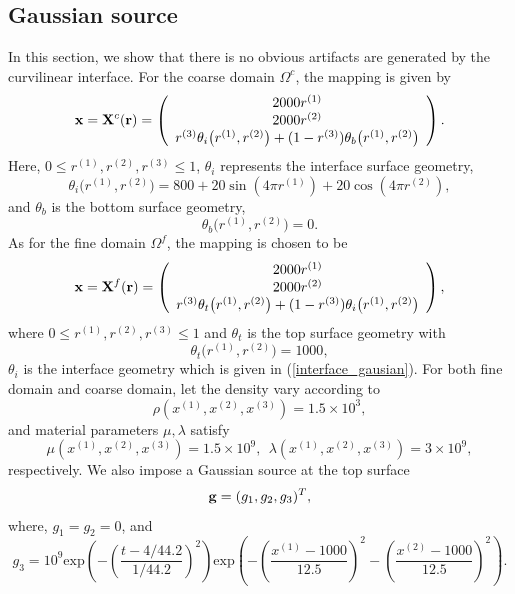 \subsection{Gaussian source}\label{gaussian_source}
In this section, we show that there is no obvious artifacts are generated by the curvilinear interface. For the coarse domain $\Omega^c$, the mapping is given by
\[ {\bf x} = {\bf X}^c({\bf r}) = \left(\begin{array}{c}
2000 r^{(1)}\\
2000 r^{(2)}\\
r^{(3)} \theta_i\big(r^{(1)}, r^{(2)}\big) + (1-r^{(3)}) \theta_b\big(r^{(1)},r^{(2)}\big) \end{array}\right). \]
Here, $0\leq r^{(1)}, r^{(2)}, r^{(3)}\leq 1$, $\theta_i$ represents the interface surface geometry,
\begin{equation}\label{interface_gausian}
\theta_i\big(r^{(1)},r^{(2)}\big) = 800+20\sin(4\pi r^{(1)})+20\cos(4\pi r^{(2)}),
\end{equation}
and $\theta_b$ is the bottom surface geometry,
\begin{equation*}
\theta_b\big(r^{(1)},r^{(2)}\big) = 0.
\end{equation*}
As for the fine domain $\Omega^f$, the mapping is chosen to be
\[ {\bf x} = {\bf X}^f({\bf r}) = \left(\begin{array}{c}
2000 r^{(1)}\\
2000 r^{(2)}\\
r^{(3)}\theta_t\big(r^{(1)},r^{(2)}\big) + (1-r^{(3)})\theta_i\big(r^{(1)},r^{(2)}\big)\end{array}\right), \]
where $0\leq r^{(1)}, r^{(2)}, r^{(3)}\leq 1$ and $\theta_t$ is the top surface geometry with
\begin{equation*}
\theta_t\big(r^{(1)},r^{(2)}\big) = 1000,
\end{equation*}
$\theta_i$ is the interface geometry which is given in (\ref{interface_gausian}). For both fine domain and coarse domain, let the density vary according to
\begin{equation*}
\rho(x^{(1)},x^{(2)},x^{(3)}) = 1.5\times 10^3,
\end{equation*}
and material parameters $\mu, \lambda$ satisfy
\begin{equation*}
\mu(x^{(1)},x^{(2)},x^{(3)}) = 1.5\times 10^9,\ \ 
\lambda(x^{(1)},x^{(2)},x^{(3)})  = 3\times 10^9,
\end{equation*}
respectively. We also impose a Gaussian source at the top surface
\[{\bf g} = (g_1,g_2,g_3)^T ,\]
where, $g_1 = g_2 = 0$, and 
\[g_3 = 10^9 \text{exp}\left(-\left(\frac{t-4/44.2}{1/44.2}\right)^2\right)\text{exp}\left(-\left(\frac{x^{(1)}-1000}{12.5}\right)^2-\left(\frac{x^{(2)}-1000}{12.5}\right)^2\right).\]

